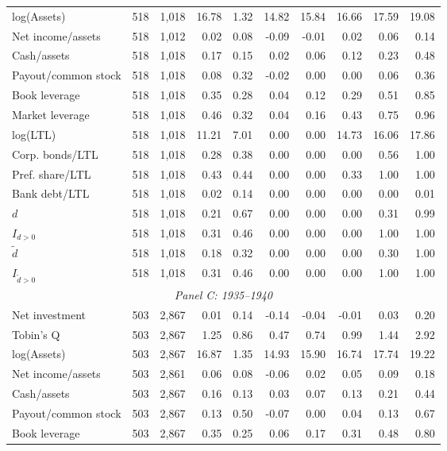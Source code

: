 \begin{threeparttable}
\begin{tabular}{lrrrrrrrrr}
log(Assets) & 518 & 1,018 & 16.78 & 1.32 & 14.82 & 15.84 & 16.66 & 17.59 & 19.08 \\
Net income/assets & 518 & 1,012 & 0.02 & 0.08 & -0.09 & -0.01 & 0.02 & 0.06 & 0.14 \\
Cash/assets & 518 & 1,018 & 0.17 & 0.15 & 0.02 & 0.06 & 0.12 & 0.23 & 0.48 \\
Payout/common stock & 518 & 1,018 & 0.08 & 0.32 & -0.02 & 0.00 & 0.00 & 0.06 & 0.36 \\
Book leverage & 518 & 1,018 & 0.35 & 0.28 & 0.04 & 0.12 & 0.29 & 0.51 & 0.85 \\
Market leverage & 518 & 1,018 & 0.46 & 0.32 & 0.04 & 0.16 & 0.43 & 0.75 & 0.96 \\
log(LTL) & 518 & 1,018 & 11.21 & 7.01 & 0.00 & 0.00 & 14.73 & 16.06 & 17.86 \\
Corp. bonds/LTL & 518 & 1,018 & 0.28 & 0.38 & 0.00 & 0.00 & 0.00 & 0.56 & 1.00 \\
Pref. share/LTL & 518 & 1,018 & 0.43 & 0.44 & 0.00 & 0.00 & 0.33 & 1.00 & 1.00 \\
Bank debt/LTL & 518 & 1,018 & 0.02 & 0.14 & 0.00 & 0.00 & 0.00 & 0.00 & 0.01 \\
\ensuremath{d} & 518 & 1,018 & 0.21 & 0.67 & 0.00 & 0.00 & 0.00 & 0.31 & 0.99 \\
\ensuremath{I_{d>0}} & 518 & 1,018 & 0.31 & 0.46 & 0.00 & 0.00 & 0.00 & 1.00 & 1.00 \\
\ensuremath{\tilde{d}} & 518 & 1,018 & 0.18 & 0.32 & 0.00 & 0.00 & 0.00 & 0.30 & 1.00 \\
\ensuremath{I_{\tilde{d}>0}} & 518 & 1,018 & 0.31 & 0.46 & 0.00 & 0.00 & 0.00 & 1.00 & 1.00 \\
\midrule
\multicolumn{10}{c}{\textit{Panel C: 1935--1940}} \\
\midrule
Net investment & 503 & 2,867 & 0.01 & 0.14 & -0.14 & -0.04 & -0.01 & 0.03 & 0.20 \\
Tobin's Q & 503 & 2,867 & 1.25 & 0.86 & 0.47 & 0.74 & 0.99 & 1.44 & 2.92 \\
log(Assets) & 503 & 2,867 & 16.87 & 1.35 & 14.93 & 15.90 & 16.74 & 17.74 & 19.22 \\
Net income/assets & 503 & 2,861 & 0.06 & 0.08 & -0.06 & 0.02 & 0.05 & 0.09 & 0.18 \\
Cash/assets & 503 & 2,867 & 0.16 & 0.13 & 0.03 & 0.07 & 0.13 & 0.21 & 0.44 \\
Payout/common stock & 503 & 2,867 & 0.13 & 0.50 & -0.07 & 0.00 & 0.04 & 0.13 & 0.67 \\
Book leverage & 503 & 2,867 & 0.35 & 0.25 & 0.06 & 0.17 & 0.31 & 0.48 & 0.80 \\

\end{tabular}
\end{threeparttable}
